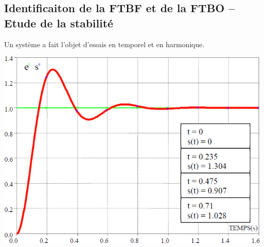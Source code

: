 \documentclass[10pt,fleqn]{article} %
\begin{document}
\def\pathfig{images}

\vspace{6cm}
\pagestyle{fancy}
\thispagestyle{plain}

\def\columnseprulecolor{\color{ocre}}
\setlength{\columnseprule}{0.4pt} 

\def\pathfig{images}

\begin{multicols}{2}
\subsection*{Identificaiton de la FTBF et de la FTBO -- Etude de la stabilité}

Un système a fait l’objet d’essais en temporel et en harmonique.
\begin{center}
\includegraphics[width=\linewidth]{images/fig_01}
\end{center}
\begin{center}

\end{center}
\end{multicols}
\end{document}
